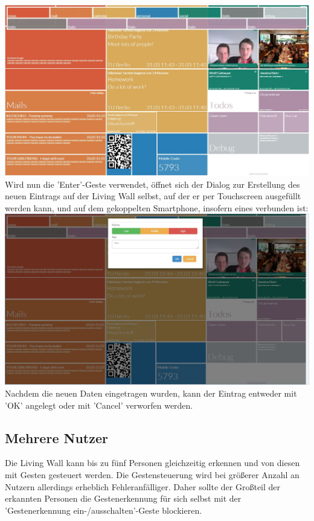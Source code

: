 \documentclass[10pt,a4paper]{report}
\begin{document}
\begin{itemize}
				\includegraphics[width=\linewidth]{SelectTodo}\\
				Wird nun die 'Enter'-Geste verwendet, öffnet sich der Dialog zur Erstellung des neuen Eintrags auf der Living Wall selbst, auf der er per Touchscreen ausgefüllt werden kann, und auf dem gekoppelten Smartphone, insofern eines verbunden ist:\\
				\includegraphics[width=\linewidth]{CreateTodo}\\
				Nachdem die neuen Daten eingetragen wurden, kann der Eintrag entweder mit 'OK' angelegt oder mit 'Cancel' verworfen werden.
			\end{itemize}

		\subsection{Mehrere Nutzer}
		Die Living Wall kann bis zu fünf Personen gleichzeitig erkennen und von diesen mit Gesten gesteuert werden. Die Gestensteuerung wird bei größerer Anzahl an Nutzern allerdings erheblich Fehleranfälliger. Daher sollte der Großteil der erkannten Personen die Gestenerkennung für sich selbst mit der 'Gestenerkennung ein-/ausschalten'-Geste blockieren.
\end{document}

